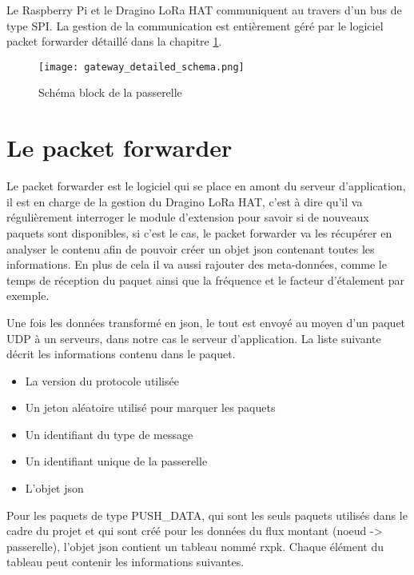 Le Raspberry Pi et le Dragino LoRa HAT communiquent au travers d'un bus de type SPI. La gestion de la communication est entièrement géré par le logiciel packet forwarder détaillé dans la chapitre \ref{ch:packet_forwarder}.

\begin{figure}[htb]
\centering 
\texttt{[image: gateway\_detailed\_schema.png]} 
\caption{Schéma block de la passerelle}
\label{fig:gateway_schema}
\end{figure}


\section{Le packet forwarder}\label{ch:packet_forwarder}

Le packet forwarder est le logiciel qui se place en amont du serveur d'application, il est en charge de la gestion du Dragino LoRa HAT, c'est à dire qu'il va régulièrement interroger le module d'extension pour savoir si de nouveaux paquets sont disponibles, si c'est le cas, le packet forwarder va les récupérer en analyser le contenu afin de pouvoir créer un objet json contenant toutes les informations. En plus de cela il va aussi rajouter des meta-données, comme le temps de réception du paquet ainsi que la fréquence et le facteur d'étalement par exemple.

Une fois les données transformé en json, le tout est envoyé au moyen d'un paquet UDP à un serveurs, dans notre cas le serveur d'application. La liste suivante décrit les informations contenu dans le paquet.

\begin{itemize}
\item La version du protocole utilisée
\item Un jeton aléatoire utilisé pour marquer les paquets
\item Un identifiant du type de message
\item Un identifiant unique de la passerelle
\item L'objet json
\end{itemize}

Pour les paquets de type PUSH\_DATA, qui sont les seuls paquets utilisés dans le cadre du projet et qui sont créé pour les données du flux montant (noeud -> passerelle), l'objet json contient un tableau nommé rxpk. Chaque élément du tableau peut contenir les informations suivantes.


